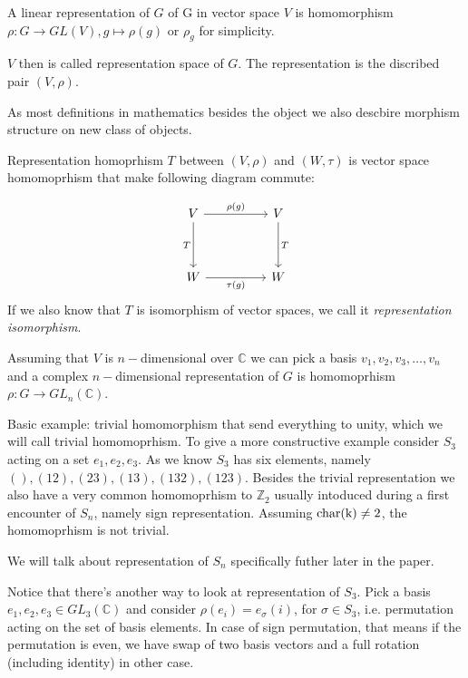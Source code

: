 \documentclass{amsart}
\def\char{\rm char}
\begin{document}
\begin{definition}
    A linear representation of $G$ of G in vector space $V$ is homomorphism $\rho: G \to GL(V), g \mapsto \rho(g)$ or $\rho_g$ for simplicity.
\end{definition}

$V$ then is called representation space of $G$. The representation is the discribed pair $(V, \rho)$.

As most definitions in mathematics besides the object we also descbire morphism structure on new class of objects.
\begin{definition}
    

 Representation homoprhism $T$ between $(V, \rho)$ and $(W, \tau)$ is vector space homomoprhism that make following diagram commute:

\end{definition}

\[\begin{tikzcd}
	V && V \\
	\\
	W && W
	\arrow["{\rho(g)}", from=1-1, to=1-3]
	\arrow["T", from=1-3, to=3-3]
	\arrow["T"', from=1-1, to=3-1]
	\arrow["{\tau(g)}"', from=3-1, to=3-3]
\end{tikzcd}\]
If we also know that $T$ is isomorphism of vector spaces, we call it \textit{representation isomorphism}. 

Assuming that $V$ is $n-$dimensional over $\mathbb{C}$ we can pick a basis $v_1, v_2, v_3,\dots, v_n$ and a complex $n-$dimensional representation of $G$ is homomoprhism $\rho: G \to GL_n (\mathbb{C})$.

Basic example:  trivial homomorphism that send everything to unity, which we will call trivial homomoprhism. 
To give a more constructive example consider $S_3$ acting on a set $e_1, e_2, e_3$.
As we know $S_3$ has six elements, namely $(), (12), (23), (13), (132), (123)$. 
Besides the trivial representation we also have a very common homomoprhism to $\mathbb{Z}_2$ usually intoduced during a first encounter of $S_n$, namely sign representation.
Assuming $\char(k) \neq 2$, the homomoprhism is not trivial. 


We will talk about representation of $S_n$ specifically futher later in the paper.

Notice that there's another way to look at representation of $S_3$. Pick a basis $e_1, e_2, e_3 \in GL_3 (\mathbb C)$ and consider $\rho (e_i) = e_\sigma(i)$, for $\sigma \in S_3$, i.e. permutation acting on the set of basis elements. In case of sign permutation, that means 
if the permutation is even, we have swap of two basis vectors and a full rotation (including identity) in other case.
\end{document}

